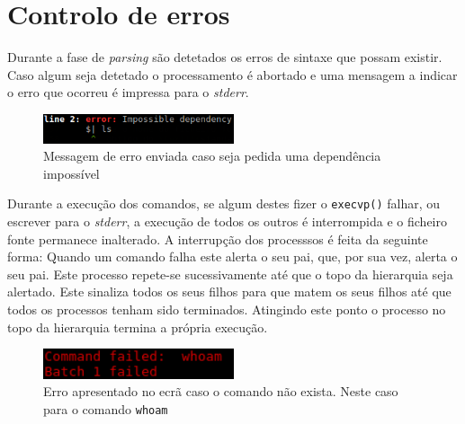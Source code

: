 \documentclass[12pt,a4paper]{report}
\begin{document}
\chapter{Controlo de erros}
    Durante a fase de \textit{parsing} são detetados os erros de sintaxe que
    possam existir. Caso algum seja detetado o processamento é abortado e uma
    mensagem a indicar o erro que ocorreu é impressa para o \textit{stderr}.

    \begin{figure}[h]
        \centering
        \includegraphics[width=0.5\textwidth]{./images/parseError.png}
        \caption{Messagem de erro enviada caso seja pedida uma dependência
                    impossível}
        \label{fig:parseError}
    \end{figure}

    Durante a execução dos comandos, se algum destes fizer o
    \texttt{execvp()} falhar, ou escrever para o \textit{stderr}, a
    execução de todos os outros é interrompida e o ficheiro fonte permanece
    inalterado. A interrupção dos processsos é feita da seguinte forma: Quando
    um comando falha este alerta o seu pai, que, por sua vez, alerta o seu pai.
    Este processo repete-se sucessivamente até que o topo da hierarquia seja
    alertado. Este sinaliza todos os seus filhos para que matem os seus
    filhos até que todos os processos tenham sido terminados. Atingindo
    este ponto o processo no topo da hierarquia termina a própria execução.

    \begin{figure}[h]
        \centering
        \includegraphics[width=0.5\textwidth]{./images/execError.png}
        \caption{Erro apresentado no ecrã caso o comando não exista. Neste caso
                    para o comando \texttt{whoam}}
    \end{figure}
\end{document}
